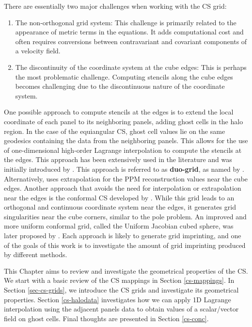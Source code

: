 There are essentially two major challenges when working with the CS grid:
\begin{enumerate}
\item
The non-orthogonal grid system: This challenge is primarily related to the appearance of
metric terms in the equations. It adds computational cost and often requires conversions
between contravariant and covariant components of a velocity field.
\item
The discontinuity of the coordinate system at the cube edges: This is perhaps the most 
problematic challenge. Computing stencils along the cube edges becomes challenging due to 
the discontinuous nature of the coordinate system.
\end{enumerate}
One possible approach to compute stencils at the edges is to extend the local coordinate 
of each panel to its neighboring panels, adding ghost cells in the halo region. In the 
case of the equiangular CS, ghost cell values lie on the same geodesics 
containing the data from the neighboring panels. This allows for the use of one-dimensional
high-order Lagrange interpolation to compute the stencils at the edges. 
This approach has been extensively used in the literature \citep{croisille:2013, 
katta:2015, katta:2015b, chen:2021} and was initially introduced by \citet{ronchi:1996}.
This approach is referred to as \textbf{duo-grid}, as named by \citet{chen:2021}.
Alternatively, \citet{putman:2007} uses extrapolation for the PPM reconstruction values near the cube edges.
Another approach that avoids the need for interpolation or extrapolation near the edges is 
the conformal CS developed by \citet{rancic:1996}. While this grid leads to an 
orthogonal and continuous coordinate system near the edges, it generates grid singularities
near the cube corners, similar to the pole problem. 
An improved and more uniform conformal grid, called the Uniform Jacobian cubed sphere, was 
later proposed by \citet{rancic:2017}.
Each approach is likely to generate grid imprinting, and one of the goals of this work is 
to investigate the amount of grid imprinting produced by different methods.

This Chapter aims to review and investigate the geometrical properties of the CS.
We start with a basic review of the CS mappings in Section \ref{cs-mappings}.
In Section \ref{sec-cs-grids}, we introduce the CS grids and investigate its geometrical properties.
Section \ref{cs-halodata} investigates how we can apply 1D Lagrange interpolation using the adjacent panels
data to obtain values of a scalar/vector field on ghost cells.
Final thoughts are presented in Section \ref{cs-conc}.

